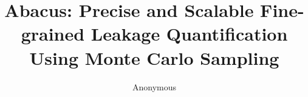 \documentclass[10pt,conference]{IEEEtran}
\newcommand{\tool}{TANA}
\renewcommand{\tool}{CleverHans}
\renewcommand{\tool}{Cygne}
\renewcommand{\tool}{Do-Re-Mi}
\renewcommand{\tool}{Ta-fa Te-fe}
\renewcommand{\tool}{Ti-ri-ti-ri}
\renewcommand{\tool}{Du-Ta-De-Ta}
\renewcommand{\tool}{\textsf{Abacus}}
\begin{document}
%
\title{\tool{}: Precise and Scalable Fine-grained %
  Leakage Quantification %
  Using %
  Monte Carlo Sampling}
\author{Anonymous}







\maketitle
\end{document}
